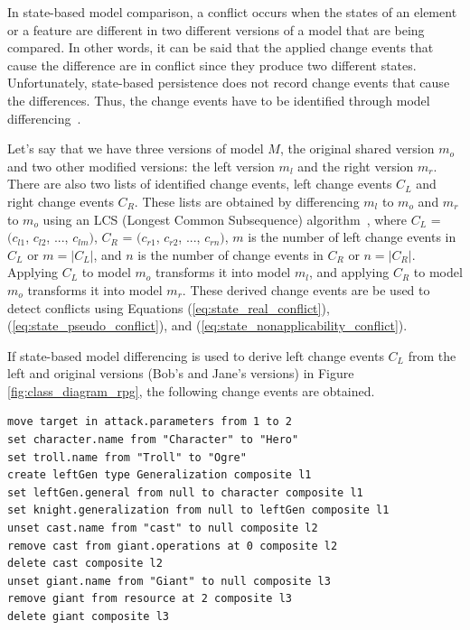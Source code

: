 In state-based model comparison, a conflict occurs when the states of an element or a feature are different in two different versions of a model that are being compared. In other words, it can be said that the applied change events that cause the difference are in conflict since they produce two different states. Unfortunately, state-based persistence does not record change events that cause the differences. Thus, the change events have to be identified through model differencing~\cite{emfcompare2018developer,yohannis2019efficient}. 

Let’s say that we have three versions of model $M$, the original shared version $m_{o}$ and two other modified versions: the left version $m_{l}$ and the right version $m_{r}$. There are also two lists of identified change events, left change events $C_{L}$ and right change events $C_{R}$. These lists are obtained by differencing $m_{l}$ to $m_{o}$ and $m_{r}$ to $m_{o}$ using an LCS (Longest Common Subsequence) algorithm~\cite{emfcompare2018developer,DBLP:journals/algorithmica/Meyers86}, where $C_{L}$ = $(c_{l1}$, $c_{l2}$, ..., $c_{lm})$, $C_{R}$ = $(c_{r1}$, $c_{r2}$, ..., $c_{rn})$, $m$ is the number of left change events in $C_{L}$ or $m = |C_{L}|$, and $n$ is the number of change events in $C_{R}$ or $n = |C_{R}|$. Applying $C_{L}$ to model $m_{o}$ transforms it into model $m_{l}$, and applying $C_{R}$ to model $m_{o}$ transforms it into model $m_{r}$. These derived change events are be used to detect conflicts using Equations (\ref{eq:state_real_conflict}), (\ref{eq:state_pseudo_conflict}), and (\ref{eq:state_nonapplicability_conflict}).  

If state-based model differencing is used to derive left change events $C_{L}$ from the left and original versions (Bob's and Jane's versions) in Figure \ref{fig:class_diagram_rpg}, the following change events are obtained. 
\begin{lstlisting}[firstnumber=1,style=eol,caption={The derived, minimal change events to produce the left version (Bob's version) in Figure \ref{fig:class_diagram_left} from the original version (Jane's version).},label=lst:cbp_left_state]
move target in attack.parameters from 1 to 2
set character.name from "Character" to "Hero"
set troll.name from "Troll" to "Ogre"
create leftGen type Generalization composite l1
set leftGen.general from null to character composite l1
set knight.generalization from null to leftGen composite l1
unset cast.name from "cast" to null composite l2
remove cast from giant.operations at 0 composite l2
delete cast composite l2
unset giant.name from "Giant" to null composite l3
remove giant from resource at 2 composite l3
delete giant composite l3
\end{lstlisting}

